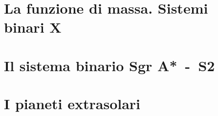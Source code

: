 \documentclass[a4paper,oneside,fleqn]{book}
\begin{document}
\section{La funzione di massa. Sistemi binari X}
\label{sec:funzione-massa}

\section{Il sistema binario Sgr A*~-~S2}
\label{sec:sgra}

\section{I pianeti extrasolari}
\label{sec:extrasolari}

\clearpage{}
\nocite{*} %
\printbibliography[title=Riferimenti bibliografici]
\end{document}
